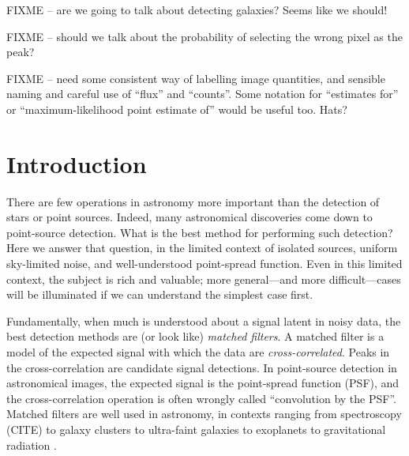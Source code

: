 \documentclass[letterpaper,preprint]{aastex62}
\begin{document}

FIXME -- are we going to talk about detecting galaxies?  Seems like we
should!

FIXME -- should we talk about the probability of selecting the wrong
pixel as the peak?

FIXME -- need some consistent way of labelling image quantities, and
sensible naming and careful use of ``flux'' and ``counts''.  Some
notation for ``estimates for'' or ``maximum-likelihood point estimate
of'' would be useful too.  Hats?


\section{Introduction}

There are few operations in astronomy more important than the
detection of stars or point sources.
Indeed, many astronomical discoveries come down to point-source
detection.
What is the best method for performing such detection?
Here we answer that question, in the limited context of isolated
sources, uniform sky-limited noise, and well-understood point-spread
function.
Even in this limited context, the subject is rich and valuable; more
general---and more difficult---cases will be illuminated if we can
understand the simplest case first.

Fundamentally, when much is understood about a signal latent in noisy
data, the best detection methods are (or look like) \emph{matched
filters}.
A matched filter is a model of the expected signal with which the data
are \emph{cross-correlated}. %
Peaks in the cross-correlation are candidate signal detections.
In point-source detection in astronomical images, the expected signal is the
point-spread function (PSF), and the cross-correlation operation is often
wrongly called ``convolution by the PSF''.
Matched filters are well used in astronomy, in contexts ranging from
spectroscopy (CITE) to
galaxy clusters \cite{redmapper, melin} to
ultra-faint galaxies \cite{willman1} to
exoplanets \cite{exoplanet} to
gravitational radiation \cite{ligo}.

\end{document}
